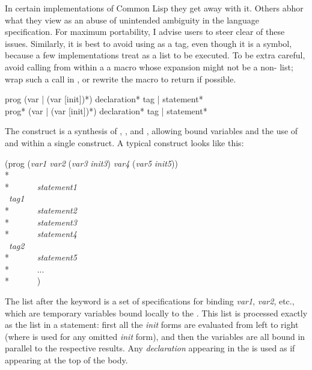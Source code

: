 \begin{defspec}
\begin{new}
In certain implementations of Common Lisp they get away with it.
Others abhor what they view as an abuse of unintended ambiguity
in the language specification.  For maximum portability, I advise
users to steer clear of these issues.  Similarly, it is best
to avoid using  as a tag, even though it is a symbol, because
a few implementations treat  as a list to be executed.
To be extra careful, avoid calling from within a 
a macro whose expansion might not be a non- list; wrap such a 
call in , or rewrite the macro to return 
if possible.
\end{new}
\end{defspec}

\begin{defmac}
prog ({var | (var [init])}*) {declaration}* {tag | statement}* \\
prog* ({var | (var [init])}*) {declaration}* {tag | statement}*

The  construct is a synthesis of , ,
and , allowing bound variables and the use of  and 
within a single construct.  A typical  construct looks like this:
\begin{lisp}
(prog (\textit{var1} \textit{var2} (\textit{var3} \textit{init3}) \textit{var4} (\textit{var5} \textit{init5})) \\*
~~~~~~ \\*
~~~~~~\textit{statement1} \\
~\textit{tag1} \\*
~~~~~~\textit{statement2} \\*
~~~~~~\textit{statement3} \\*
~~~~~~\textit{statement4} \\
~\textit{tag2} \\*
~~~~~~\textit{statement5} \\*
~~~~~~... \\*
~~~~~~)
\end{lisp}
The list after the keyword  is a set of specifications for binding
\textit{var1}, \textit{var2}, etc.,
which are temporary variables bound locally to the .
This list is processed exactly as the list in a  statement:
first all the \textit{init} forms are evaluated from left to right
(where {\false} is used for
any omitted \textit{init} form), and then the variables are all bound in
parallel to the respective results.
Any \textit{declaration} appearing in the  is used as if appearing
at the top of the  body.


\end{defmac}
